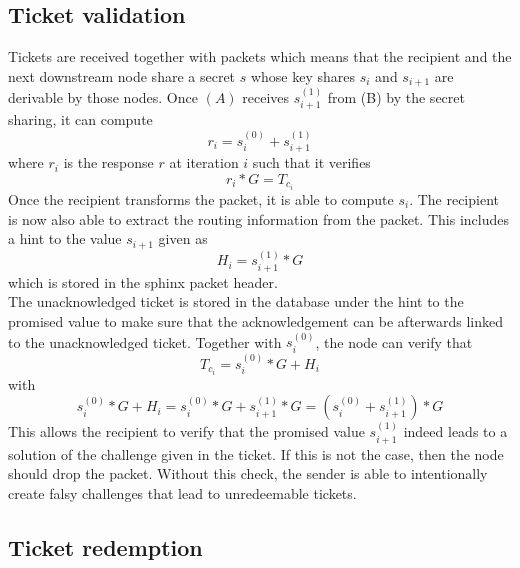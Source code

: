 \subsection{Ticket validation}
Tickets are received together with packets which means that the recipient and the next downstream node share a secret $s$ whose key shares $s_i$ and $s_{i+1}$ are derivable by those nodes.
\newline Once $(A)$ receives $s_{i+1}^{(1)}$ from (B) by the secret sharing, it can compute $$r_i=s_i^{(0)}+s_{i+1}^{(1)}$$ where $r_i$ is the response $r$ at iteration $i$ such that it verifies
$$r_i*G=T_{c_i}$$
Once the recipient transforms the packet, it is able to compute $s_i$. The recipient is now also able to extract the routing information from the packet.
This includes a hint to the value $s_{i+1}$ given as $$H_i=s_{i+1}^{(1)}*G$$ which is stored in the sphinx packet header.
\\The unacknowledged ticket is stored in the database under the hint to the promised value to make sure that the acknowledgement can be afterwards linked to the unacknowledged ticket.
\newline Together with $s_i^{(0)}$, the node can verify that $$T_{c_i}=s_i^{(0)}*G+H_i$$ with $$s_i^{(0)}*G+H_i=s_i^{(0)}*G+s_{i+1}^{(1)}*G=(s_i^{(0)}+s_{i+1}^{(1)})*G$$
This allows the recipient to verify that the promised value $s_{i+1}^{(1)}$ indeed leads to a solution of the challenge given in the ticket.
If this is not the case, then the node should drop the packet.
\newline Without this check, the sender is able to intentionally create falsy challenges that lead to unredeemable tickets.


\subsection{Ticket redemption}


